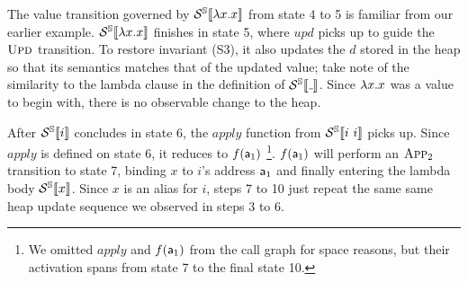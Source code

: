 The value transition governed by $\mathcal{S}^{\mathbb{S}}\llbracket {\lambda x. x} \rrbracket$ from state 4 to 5 is
familiar from our earlier example.
$\mathcal{S}^{\mathbb{S}}\llbracket {\lambda x. x} \rrbracket$ finishes in state 5, where $upd$ picks up to guide the
$\textsc{Upd}$ transition. To restore invariant (S3), it also updates the $d$ stored
in the heap so that its semantics matches that of the updated value; take note
of the similarity to the lambda clause in the definition of $\semst{\wild}$.
Since $\lambda x. x$ was a value to begin with, there is no observable change to
the heap.

After $\mathcal{S}^{\mathbb{S}}\llbracket {i} \rrbracket$ concludes in state 6, the $apply$ function from $\mathcal{S}^{\mathbb{S}}\llbracket {i~i} \rrbracket$
picks up. Since $apply$ is defined on state 6, it reduces to $f(\mathsf{a}_1)$%
\footnote{We omitted $apply$ and $f(\mathsf{a}_1)$ from the call graph for space reasons, but
their activation spans from state 7 to the final state 10.}.
$f(\mathsf{a}_1)$ will perform an $\textsc{App}_2$ transition to state 7, binding $x$ to $i$'s
address $\mathsf{a}_1$ and finally entering the lambda body $\mathcal{S}^{\mathbb{S}}\llbracket {x} \rrbracket$. Since $x$ is
an alias for $i$, steps 7 to 10 just repeat the same same heap update sequence
we observed in steps 3 to 6.

